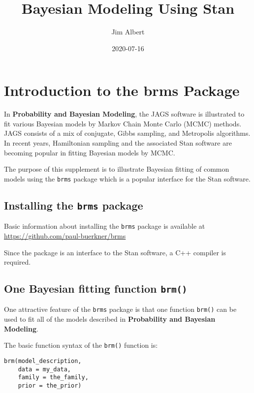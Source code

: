 \documentclass[
]{book}
\title{Bayesian Modeling Using Stan}
\author{Jim Albert}
\date{2020-07-16}
\begin{document}
\maketitle

{
\setcounter{tocdepth}{1}
\tableofcontents
}
\hypertarget{introduction-to-the-brms-package}{%
\chapter{Introduction to the brms Package}\label{introduction-to-the-brms-package}}

In \textbf{Probability and Bayesian Modeling}, the JAGS software is illustrated to fit various Bayesian models by Markov Chain Monte Carlo (MCMC) methods. JAGS consists of a mix of conjugate, Gibbs sampling, and Metropolis algorithms. In recent years, Hamiltonian sampling and the associated Stan software are becoming popular in fitting Bayesian models by MCMC.

The purpose of this supplement is to illustrate Bayesian fitting of common models using the \texttt{brms} package which is a popular interface for the Stan software.

\hypertarget{installing-the-brms-package}{%
\section{\texorpdfstring{Installing the \texttt{brms} package}{Installing the brms package}}\label{installing-the-brms-package}}

Basic information about installing the \texttt{brms} package is available at \url{https://github.com/paul-buerkner/brms}

Since the package is an interface to the Stan software, a C++ compiler is required.

\hypertarget{one-bayesian-fitting-function-brm}{%
\section{\texorpdfstring{One Bayesian fitting function \texttt{brm()}}{One Bayesian fitting function brm()}}\label{one-bayesian-fitting-function-brm}}

One attractive feature of the \texttt{brms} package is that one function \texttt{brm()} can be used to fit all of the models described in \textbf{Probability and Bayesian Modeling}.

The basic function syntax of the \texttt{brm()} function is:

\begin{verbatim}
brm(model_description, 
    data = my_data, 
    family = the_family,
    prior = the_prior)
\end{verbatim}
\end{document}
